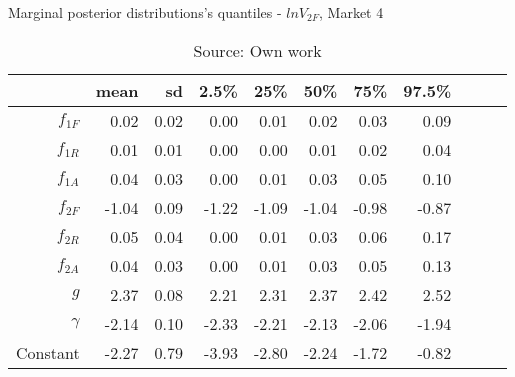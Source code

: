\begin{table}[H]
\caption{Marginal posterior distributions's quantiles - $ln V_{2F}$,  Market 4}
\centering
\begin{tabular}{rrrrrrrrrrr}
  \toprule
           & mean  & sd   & 2.5\% & 25\%  & 50\%  & 75\%  & 97.5\%\\ 
  \hline

  $f_{1F}$ & 0.02  & 0.02 & 0.00  & 0.01  & 0.02  & 0.03  & 0.09  \\ 
  $f_{1R}$ & 0.01  & 0.01 & 0.00  & 0.00  & 0.01  & 0.02  & 0.04  \\ 
  $f_{1A}$ & 0.04  & 0.03 & 0.00  & 0.01  & 0.03  & 0.05  & 0.10  \\ 
  $f_{2F}$ & -1.04 & 0.09 & -1.22 & -1.09 & -1.04 & -0.98 & -0.87 \\ 
  $f_{2R}$ & 0.05  & 0.04 & 0.00  & 0.01  & 0.03  & 0.06  & 0.17  \\ 
  $f_{2A}$ & 0.04  & 0.03 & 0.00  & 0.01  & 0.03  & 0.05  & 0.13  \\ 
  $g$      & 2.37  & 0.08 & 2.21  & 2.31  & 2.37  & 2.42  & 2.52  \\ 
  $\gamma$ & -2.14 & 0.10 & -2.33 & -2.21 & -2.13 & -2.06 & -1.94 \\ 
  Constant & -2.27 & 0.79 & -3.93 & -2.80 & -2.24 & -1.72 & -0.82 \\ 
     \bottomrule
\end{tabular}
\caption*{Source: Own work}
\end{table}
